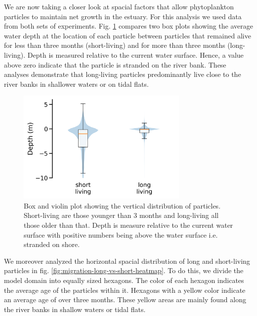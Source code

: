 \documentclass[npg, manuscript]{copernicus}
\begin{document}
We are now taking a closer look at spacial factors that allow phytoplankton particles to maintain net growth in the estuary. 
For this analysis we used data from both sets of experiments.
Fig. \ref{fig:migration-long-vs-short} compares two box plots showing the average water depth at the location of each particle between particles that remained alive for less than three months (short-living) and for more than three months (long-living).
Depth is measured relative to the current water surface.
Hence, a value above zero indicate that the particle is stranded on the river bank.
These analyses demonstrate that long-living particles predominantly live close to the river banks in shallower waters or on tidal flats.

\begin{figure}
    \includegraphics[width=8.3cm]{figures/retention_boxplot.png}
    \caption[]{Box and violin plot showing the vertical distribution of particles.  Short-living are those younger than 3 months and long-living all those older than that. Depth is measure relative to the current water surface with positive numbers being above the water surface i.e. stranded on shore.}
    \label{fig:migration-long-vs-short}
\end{figure}

We moreover analyzed the horizontal spacial distribution of long and short-living particles in fig. \ref{fig:migration-long-vs-short-heatmap}.
To do this, we divide the model domain into equally sized hexagons.
The color of each hexagon indicates the average age of the particles within it.
Hexagons with a yellow color indicate an average age of over three months.
These yellow areas are mainly found along the river banks in shallow waters or tidal flats.
\end{document}
